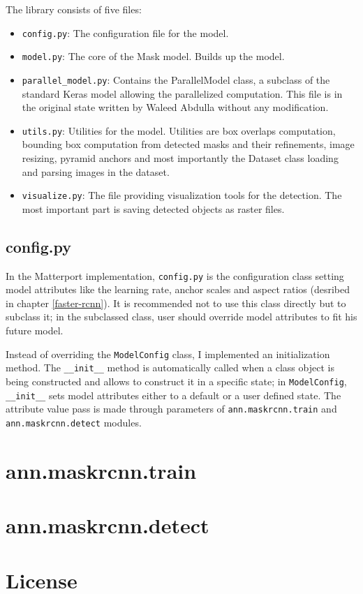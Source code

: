 The library consists of five files:
\begin{itemize}
	 \item \verb|config.py|: The configuration file for the model. 
	 \item \verb|model.py|: The core of the Mask  model. Builds up the model.
	 \item \verb|parallel_model.py|: Contains the ParallelModel class, a subclass of the standard Keras model allowing the parallelized computation. This file is in the original state written by Waleed Abdulla without any modification.
	 \item \verb|utils.py|: Utilities for the model. Utilities are box overlaps computation, bounding box computation from detected masks and their refinements, image resizing, pyramid anchors and most importantly the Dataset class loading and parsing images in the dataset.
	 \item \verb|visualize.py|: The file providing visualization tools for the detection. The most important part is saving detected objects as raster files.
\end{itemize}

\subsection{config.py}
\label{config}

In the Matterport implementation, \verb|config.py| is the configuration class setting model attributes like the learning rate,  anchor scales and aspect ratios (desribed in chapter \ref{faster-rcnn}). It is recommended not to use this class directly but to subclass it; in the subclassed class, user should override model attributes to fit his future model.

Instead of overriding the \verb|ModelConfig| class, I implemented an initialization method. The \verb|__init__| method is automatically called when a class object is being constructed and allows to construct it in a specific state; in \verb|ModelConfig|, \verb|__init__| sets model attributes either to a default or a user defined state. The attribute value pass is made through parameters of \verb|ann.maskrcnn.train| and \verb|ann.maskrcnn.detect| modules.

\section{ann.maskrcnn.train}
\label{train-module}

\section{ann.maskrcnn.detect}
\label{detect-module}

\section{License}
\label{license}